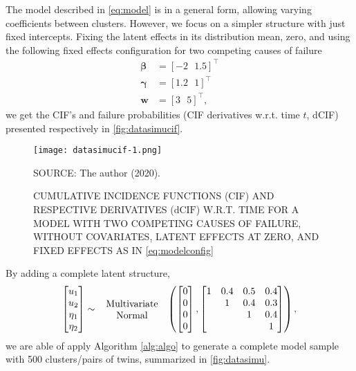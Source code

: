 The model described in \autoref{eq:model} is in a general form, allowing
varying coefficients between clusters. However, we focus on a simpler
structure with just fixed intercepts. Fixing the latent effects in its
distribution mean, zero, and using the following fixed effects
configuration for two competing causes of failure
\begin{align}
 \bm{\beta} &= [-2~~~1.5]^{\top}\nonumber\\
 \bm{\gamma} &= [1.2~~~1]^{\top}\label{eq:modelconfig}\\
 \bm{w} &= [3~~~5]^{\top}\nonumber,
\end{align}
we get the CIF's and failure probabilities (CIF derivatives w.r.t. time
\(t\), dCIF) presented respectively in \autoref{fig:datasimucif}.

\begin{figure}[H]
 \setlength{\abovecaptionskip}{.0001pt}
 \caption{CUMULATIVE INCIDENCE FUNCTIONS (CIF) AND RESPECTIVE
          DERIVATIVES (\(\text{dCIF}\)) W.R.T. TIME FOR A MODEL WITH
          TWO COMPETING CAUSES OF FAILURE, WITHOUT COVARIATES, LATENT
          EFFECTS AT ZERO, AND FIXED EFFECTS AS IN
          \autoref{eq:modelconfig}}
 \vspace{0.2cm}\centering
 \texttt{[image: datasimucif-1.png]}\\
 \begin{footnotesize}
  SOURCE: The author (2020).
 \end{footnotesize}
 \label{fig:datasimucif}
\end{figure}

By adding a complete latent structure,
\[
 \begin{bmatrix} u_{1}\\u_{2}\\\eta_{1}\\\eta_{2} \end{bmatrix}
 \sim\parbox{2.5cm}{\centering Multivariate Normal}
 \left(\begin{bmatrix} 0\\0\\0\\0 \end{bmatrix},
       \begin{bmatrix}
        1&0.4&0.5&0.4\\
         &1&0.4&0.3\\
         &&1&0.4\\
         &&&1
       \end{bmatrix}
 \right),
\]
we are able of apply Algorithm \autoref{alg:algo} to generate a complete
model sample with 500 clusters/pairs of twins, summarized in
\autoref{fig:datasimu}.

